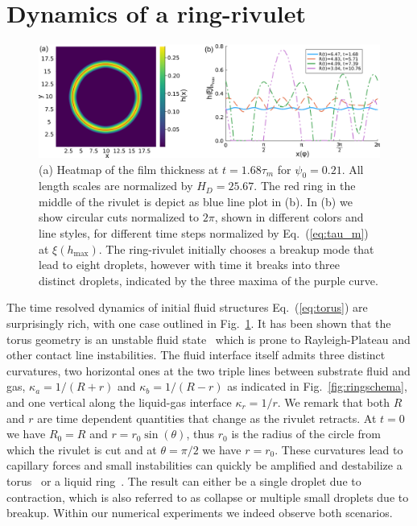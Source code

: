 \documentclass[twoside,twocolumn,9pt]{article}
\begin{document}
\section{Dynamics of a ring-rivulet}
\label{sec:dynamics}
\begin{figure}
    \centering
    \includegraphics[width=1.0\textwidth]{assets/heatcirc.png}
    \caption{(a) Heatmap of the film thickness at $t=1.68\tau_m$ for $\psi_0 = 0.21$. 
    All length scales are normalized by $H_D = 25.67$. 
    The red ring in the middle of the rivulet is depict as blue line plot in (b).
    In (b) we show circular cuts normalized to $2\pi$, shown in different colors and line styles, for different time steps normalized by Eq.~(\ref{eq:tau_m}) at $\xi(h_{\max})$.
    The ring-rivulet initially chooses a breakup mode that lead to eight droplets, however with time it breaks into three distinct droplets, indicated by the three maxima of the purple curve.}
    \label{fig:ThreeDToOneD}
\end{figure}
The time resolved dynamics of initial fluid structures Eq.~(\ref{eq:torus}) are surprisingly rich, with one case outlined in Fig.~\ref{fig:ThreeDToOneD}.
It has been shown that the torus geometry is an unstable fluid state~\cite{gonzalezStabilityLiquidRing2013, mehrabianCapillaryBreakupLiquid2013} which is prone to Rayleigh-Plateau and other contact line instabilities. 
The fluid interface itself admits three distinct curvatures, two horizontal ones at the two triple lines between substrate fluid and gas, $\kappa_a = 1/(R+r)$ and $\kappa_b = 1/(R-r)$ as indicated in Fig.~\ref{fig:ringschema}, and one vertical along the liquid-gas interface $\kappa_r = 1/r$.
We remark that both $R$ and $r$ are time dependent quantities that change as the rivulet retracts.
At $t=0$ we have $R_0 = R$ and $r = r_0\sin(\theta)$, thus $r_0$ is the radius of the circle from which the rivulet is cut and at $\theta = \pi/2$ we have $r=r_0$.
These curvatures lead to capillary forces and small instabilities can quickly be amplified and destabilize a torus~\cite{mehrabianCapillaryBreakupLiquid2013} or a liquid ring~\cite{gonzalezStabilityLiquidRing2013}. 
The result can either be a single droplet due to contraction, which is also referred to as collapse or multiple small droplets due to breakup.
Within our numerical experiments we indeed observe both scenarios.
\end{document}
